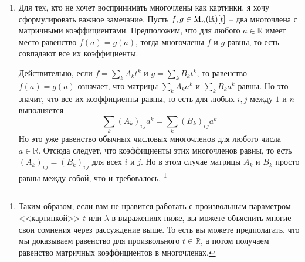 \begin{enumerate}
\item\label{remark::MatrixPolyEq} Для тех, кто не хочет воспринимать многочлены как картинки, я хочу сформулировать важное замечание.
Пусть $f, g\in \operatorname{M}_{n}(\mathbb R)[t]$ -- два многочлена с матричными коэффициентами.
Предположим, что для любого $a\in\mathbb R$ имеет место равенство $f(a) = g(a)$, тогда многочлены $f$ и $g$ равны, то есть совпадают все их коэффициенты.

Действительно, если $f = \sum_k A_k t^k$ и $g = \sum_k B_k t^k$, то равенство $f(a) = g(a)$ означает, что матрицы $\sum_k A_k a^k$ и $\sum_k B_k a^k$ равны.
Но это значит, что все их коэффициенты равны, то есть для любых $i,j$ между $1$ и $n$ выполняется
\[
\sum_k (A_k)_{i\,j} a^k = \sum_k (B_k)_{i\,j} a^k
\]
Но это уже равенство обычных числовых многочленов для любого числа $a\in \mathbb R$.
Отсюда следует, что коэффициенты этих многочленов равны, то есть $(A_k)_{i\,j} = (B_k)_{i\,j}$ для всех $i$ и $j$.
Но в этом случае матрицы $A_k$ и $B_k$ просто равны между собой, что и требовалось.%
\footnote{
Таким образом, если вам не нравится работать с произвольным параметром-<<картинкой>> $t$ или $\lambda$ в выражениях ниже, вы можете объяснить многие свои сомнения через рассуждение выше.
То есть вы можете предполагать, что мы доказываем равенство для произвольного $t\in \mathbb R$, а потом получаем равенство матричных коэффициентов в многочленах.}


\end{enumerate}
